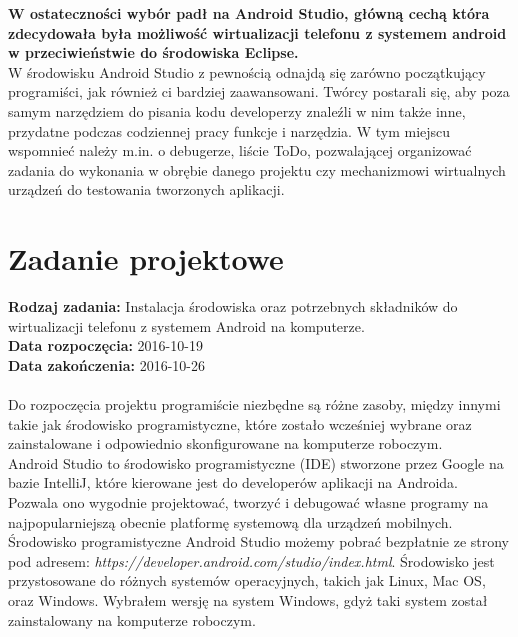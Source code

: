 \textbf{W ostateczności wybór padł na Android Studio, główną cechą która zdecydowała była możliwość wirtualizacji telefonu z systemem android w przeciwieństwie do środowiska Eclipse.}
\\

W środowisku Android Studio z pewnością odnajdą się zarówno początkujący programiści, jak również ci bardziej zaawansowani. Twórcy postarali się, aby poza samym narzędziem do pisania kodu developerzy znaleźli w nim także inne, przydatne podczas codziennej pracy funkcje i narzędzia. W tym miejscu wspomnieć należy m.in. o debugerze, liście ToDo, pozwalającej organizować zadania do wykonania w obrębie danego projektu czy mechanizmowi wirtualnych urządzeń do testowania tworzonych aplikacji.




\section{Zadanie projektowe}
\noindent\textbf{Rodzaj zadania:} Instalacja środowiska oraz potrzebnych składników do wirtualizacji telefonu z systemem Android na komputerze. \\

\noindent\textbf{Data rozpoczęcia:} 2016-10-19\\

\noindent\textbf{Data zakończenia:} 2016-10-26\\
\\

Do rozpoczęcia projektu programiście niezbędne są różne zasoby, między innymi takie jak środowisko programistyczne, które zostało wcześniej wybrane oraz zainstalowane i odpowiednio skonfigurowane na komputerze roboczym.
\\

Android Studio to środowisko programistyczne (IDE) stworzone przez Google na bazie IntelliJ, które kierowane jest do developerów aplikacji na Androida. Pozwala ono wygodnie projektować, tworzyć i debugować własne programy na najpopularniejszą obecnie platformę systemową dla urządzeń mobilnych.
\\

Środowisko programistyczne Android Studio możemy pobrać bezpłatnie ze strony pod adresem: \textit{https://developer.android.com/studio/index.html}. Środowisko jest przystosowane do różnych systemów operacyjnych, takich jak Linux, Mac OS, oraz Windows. Wybrałem wersję na system Windows, gdyż taki system został zainstalowany na komputerze roboczym.
\\


